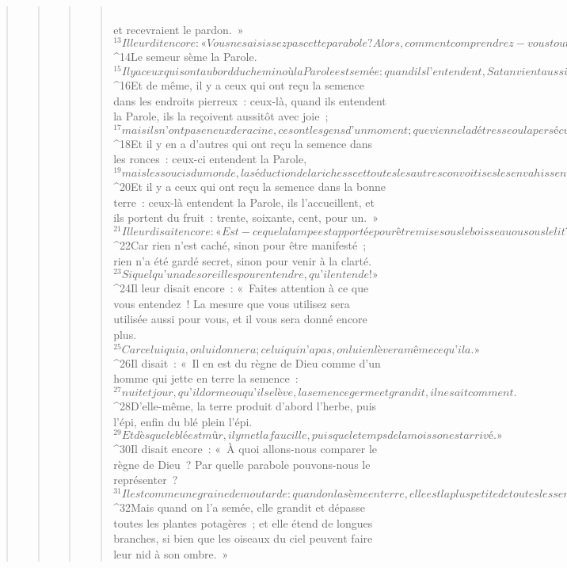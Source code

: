 \begin{verse}
\begin{verse}
\begin{verse}
\begin{verse}
        \\et recevraient le pardon. »
${}^{13}Il leur dit encore : « Vous ne saisissez pas cette parabole ? Alors, comment comprendrez-vous toutes les paraboles ? 
${}^{14}Le semeur sème la Parole. 
${}^{15}Il y a ceux qui sont au bord du chemin où la Parole est semée : quand ils l’entendent, Satan vient aussitôt et enlève la Parole semée en eux. 
${}^{16}Et de même, il y a ceux qui ont reçu la semence dans les endroits pierreux : ceux-là, quand ils entendent la Parole, ils la reçoivent aussitôt avec joie ; 
${}^{17}mais ils n’ont pas en eux de racine, ce sont les gens d’un moment ; que vienne la détresse ou la persécution à cause de la Parole, ils trébuchent aussitôt. 
${}^{18}Et il y en a d’autres qui ont reçu la semence dans les ronces : ceux-ci entendent la Parole, 
${}^{19}mais les soucis du monde, la séduction de la richesse et toutes les autres convoitises les envahissent et étouffent la Parole, qui ne donne pas de fruit. 
${}^{20}Et il y a ceux qui ont reçu la semence dans la bonne terre : ceux-là entendent la Parole, ils l’accueillent, et ils portent du fruit : trente, soixante, cent, pour un. »
${}^{21}Il leur disait encore : « Est-ce que la lampe est apportée pour être mise sous le boisseau ou sous le lit ? N’est-ce pas pour être mise sur le lampadaire ? 
${}^{22}Car rien n’est caché, sinon pour être manifesté ; rien n’a été gardé secret, sinon pour venir à la clarté. 
${}^{23}Si quelqu’un a des oreilles pour entendre, qu’il entende ! »
${}^{24}Il leur disait encore : « Faites attention à ce que vous entendez ! La mesure que vous utilisez sera utilisée aussi pour vous, et il vous sera donné encore plus. 
${}^{25}Car celui qui a, on lui donnera ; celui qui n’a pas, on lui enlèvera même ce qu’il a. »
${}^{26}Il disait : « Il en est du règne de Dieu comme d’un homme qui jette en terre la semence : 
${}^{27}nuit et jour, qu’il dorme ou qu’il se lève, la semence germe et grandit, il ne sait comment. 
${}^{28}D’elle-même, la terre produit d’abord l’herbe, puis l’épi, enfin du blé plein l’épi. 
${}^{29}Et dès que le blé est mûr, il y met la faucille, puisque le temps de la moisson est arrivé. »
${}^{30}Il disait encore : « À quoi allons-nous comparer le règne de Dieu ? Par quelle parabole pouvons-nous le représenter ? 
${}^{31}Il est comme une graine de moutarde : quand on la sème en terre, elle est la plus petite de toutes les semences. 
${}^{32}Mais quand on l’a semée, elle grandit et dépasse toutes les plantes potagères ; et elle étend de longues branches, si bien que les oiseaux du ciel peuvent faire leur nid à son ombre. »

\end{verse}
\end{verse}
\end{verse}
\end{verse}
